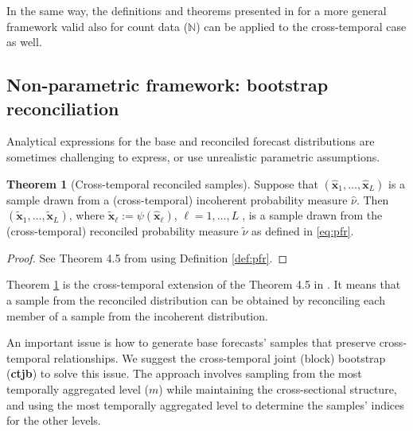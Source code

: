 \documentclass[a4paper,11pt]{article}
\newcommand{\xvet}{\bm{x}}
\theoremstyle{definition}
\newtheorem{theorem}{Theorem}[section]
\begin{document}
In the same way, the definitions and theorems presented in \citet{corani2021} for a more general framework valid also for count data ($\mathbb{N}$) can be applied to the cross-temporal case as well.


\subsection{Non-parametric framework: bootstrap reconciliation}\label{ssec:boot}

Analytical expressions for the base and reconciled forecast distributions are sometimes challenging to express, or use unrealistic parametric assumptions.

\begin{theorem}[Cross-temporal reconciled samples] \label{thm:rs}
	Suppose that $\left(\widehat{\xvet}_1, \ldots, \widehat{\xvet}_L\right)$ is a sample drawn from a (cross-temporal) incoherent probability measure $\widehat{\nu}$. Then $\left(\widetilde{\xvet}_1, \ldots, \widetilde{\xvet}_L\right)$, where $\widetilde{\xvet}_\ell:=\psi\left(\widehat{\xvet}_\ell\right)$, $\ell= 1, \ldots, L\;$, is a sample drawn from the (cross-temporal) reconciled probability measure $\widetilde{\nu}$ as defined in \eqref{eq:pfr}.
\end{theorem}
\begin{proof}
	See Theorem 4.5 from \cite{panagiotelis2023} using Definition \ref{def:pfr}.
\end{proof}
Theorem \ref{thm:rs} is the cross-temporal extension of the Theorem 4.5 in \cite{panagiotelis2023}. It means that a sample from the reconciled distribution can be obtained by reconciling each member of a sample from the incoherent distribution.

An important issue is how to generate base forecasts' samples that preserve cross-temporal relationships. We suggest the cross-temporal joint (block) bootstrap (\textbf{ctjb}) to solve this issue. The approach involves sampling from the most temporally aggregated level ($m$) while maintaining the cross-sectional structure, and using the most temporally aggregated level to determine the samples' indices for the other levels.




\end{document}
